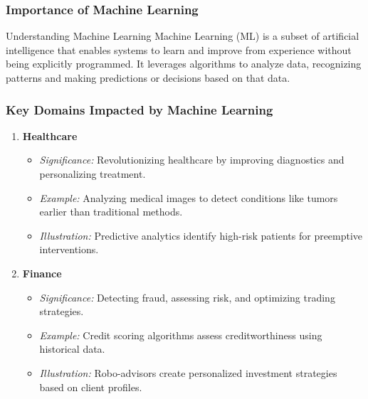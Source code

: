 \documentclass[aspectratio=169]{beamer}
\begin{document}
\begin{frame}[fragile]
    \frametitle{Importance of Machine Learning}
    \begin{block}{Understanding Machine Learning}
        Machine Learning (ML) is a subset of artificial intelligence that enables systems to learn and improve from experience without being explicitly programmed. 
        It leverages algorithms to analyze data, recognizing patterns and making predictions or decisions based on that data.
    \end{block}
\end{frame}

\begin{frame}[fragile]
    \frametitle{Key Domains Impacted by Machine Learning}
    \begin{enumerate}
        \item \textbf{Healthcare}
            \begin{itemize}
                \item \textit{Significance:} Revolutionizing healthcare by improving diagnostics and personalizing treatment.
                \item \textit{Example:} Analyzing medical images to detect conditions like tumors earlier than traditional methods.
                \item \textit{Illustration:} Predictive analytics identify high-risk patients for preemptive interventions.
            \end{itemize}
        \item \textbf{Finance}
            \begin{itemize}
                \item \textit{Significance:} Detecting fraud, assessing risk, and optimizing trading strategies.
                \item \textit{Example:} Credit scoring algorithms assess creditworthiness using historical data.
                \item \textit{Illustration:} Robo-advisors create personalized investment strategies based on client profiles.
            \end{itemize}
    \end{enumerate}
\end{frame}
\end{document}
